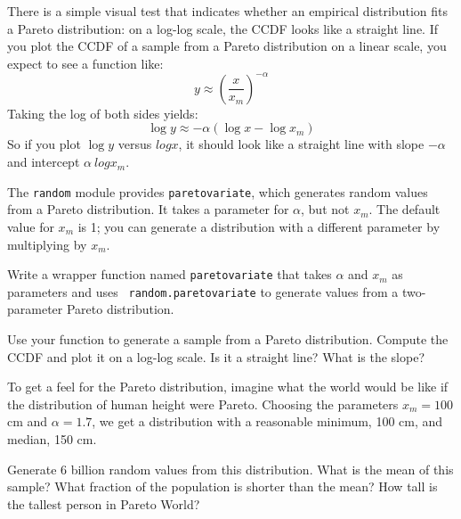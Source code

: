 \documentclass[12pt]{book}
\begin{document}
There is a simple visual test that indicates whether an empirical
distribution fits a Pareto distribution: on a log-log scale, the CCDF
looks like a straight line.
If you plot the CCDF of a sample from a Pareto distribution on a
linear scale, you expect to see a function like:
%
\[ y \approx \left( \frac{x}{x_m} \right) ^{-\alpha} \]
%
Taking the log of both sides yields:
%
\[ \log y \approx -\alpha(\log x - \log x_{m}) \]
%
So if you plot $\log y$ versus $log x$, it should look like a straight
line with slope $-\alpha$ and intercept
$\alpha~log x_{m}$.

\begin{exercise}
The {\tt random} module provides {\tt paretovariate},
which generates random values from a Pareto distribution.  It takes
a parameter for $\alpha$, but not $x_{m}$.  The
default value for $x_{m}$ is 1; you can generate a distribution
with a different parameter by multiplying by $x_{m}$.

Write a wrapper function named {\tt paretovariate} that takes
$\alpha$ and $x_{m}$ as parameters and uses {\tt
  random.paretovariate} to generate values from a two-parameter Pareto
distribution.

Use your function to generate a sample from a Pareto distribution.
Compute the CCDF and plot it on a log-log scale.  Is it a straight
line?  What is the slope?

\end{exercise}

\begin{exercise}
To get a feel for the Pareto distribution, imagine what the world
would be like if the distribution of human height were Pareto.
Choosing the parameters $x_{m} = 100$ cm and $\alpha = 1.7$, we
get a distribution with a reasonable minimum, 100 cm,
and median, 150 cm.

Generate 6 billion random values from this distribution.  What is the
mean of this sample?  What fraction of the population is shorter than
the mean?  How tall is the tallest person in Pareto World?

\end{exercise}
\end{document}

